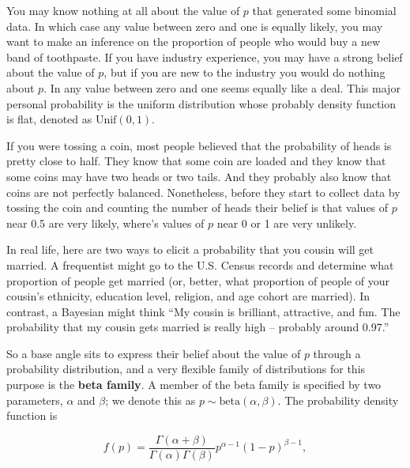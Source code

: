 \documentclass[]{book}
\theoremstyle{definition}
\theoremstyle{definition}
\theoremstyle{remark}
\let\BeginKnitrBlock\begin \let\EndKnitrBlock\end
\begin{document}
\BeginKnitrBlock{example}
\protect\hypertarget{ex:unnamed-chunk-2}{}{\label{ex:unnamed-chunk-2}}You
may know nothing at all about the value of \(p\) that generated some
binomial data. In which case any value between zero and one is equally
likely, you may want to make an inference on the proportion of people
who would buy a new band of toothpaste. If you have industry experience,
you may have a strong belief about the value of \(p\), but if you are
new to the industry you would do nothing about \(p\). In any value
between zero and one seems equally like a deal. This major personal
probability is the uniform distribution whose probably density function
is flat, denoted as \(\text{Unif}(0,1)\).
\EndKnitrBlock{example}

\BeginKnitrBlock{example}
\protect\hypertarget{ex:unnamed-chunk-3}{}{\label{ex:unnamed-chunk-3}}If you
were tossing a coin, most people believed that the probability of heads
is pretty close to half. They know that some coin are loaded and they
know that some coins may have two heads or two tails. And they probably
also know that coins are not perfectly balanced. Nonetheless, before
they start to collect data by tossing the coin and counting the number
of heads their belief is that values of \(p\) near 0.5 are very likely,
where's values of \(p\) near 0 or 1 are very unlikely.
\EndKnitrBlock{example}

\BeginKnitrBlock{example}
\protect\hypertarget{ex:unnamed-chunk-4}{}{\label{ex:unnamed-chunk-4}}In
real life, here are two ways to elicit a probability that you cousin
will get married. A frequentist might go to the U.S. Census records and
determine what proportion of people get married (or, better, what
proportion of people of your cousin's ethnicity, education level,
religion, and age cohort are married). In contrast, a Bayesian might
think ``My cousin is brilliant, attractive, and fun. The probability
that my cousin gets married is really high -- probably around 0.97.''
\EndKnitrBlock{example}

So a base angle sits to express their belief about the value of \(p\)
through a probability distribution, and a very flexible family of
distributions for this purpose is the \textbf{beta family}. A member of
the beta family is specified by two parameters, \(\alpha\) and
\(\beta\); we denote this as \(p \sim \text{beta}(\alpha, \beta)\). The
probability density function is

\begin{equation}
f(p) = \frac{\Gamma(\alpha+\beta)}{\Gamma(\alpha)\Gamma(\beta)} p^{\alpha-1} (1-p)^{\beta-1},
\label{eq:beta}
\end{equation}
\end{document}
